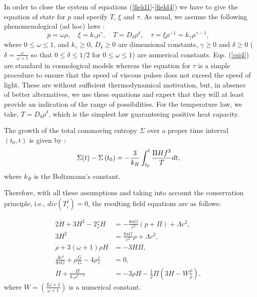 \documentclass{revtex4}
\begin{document}
In order to close the system of equations (\ref{field1}-\ref{field4}) we
have to give the equation of state for $p$ and specify $T$, $\xi $ and $\tau
$. As usual, we assume the following phenomenological (ad hoc) laws \cite
{Ma95}:
\begin{equation}
p=\omega \rho ,\quad \xi =k_{\gamma }\rho ^{\gamma },\quad T=D_{\delta }\rho
^{\delta },\quad \tau =\xi \rho ^{-1}=k_{\gamma }\rho ^{\gamma -1},
\label{csi4}
\end{equation}
where $0\leq \omega \leq 1$, and $k_{\gamma }\geq 0$, $D_{\delta }\geq 0$
are dimensional constants, $\gamma \geq 0$ and $\delta \geq 0$ ($\delta =%
\frac{\omega }{\omega +1}$ so that $0\leq \delta \leq 1/2$ for $0\leq \omega
\leq 1$) are numerical constants. Eqs. (\ref{csi4}) are standard in
cosmological models whereas the equation for $\tau $ is a simple procedure
to ensure that the speed of viscous pulses does not exceed the speed of
light. These are without sufficient thermodynamical motivation, but, in
absence of better alternatives, we use these equations and expect that they
will at least provide an indication of the range of possibilities. For the
temperature law, we take, $T=D_{\delta }\rho ^{\delta }$, which is the
simplest law guaranteeing positive heat capacity.

The growth of the total commoving entropy $\Sigma $ over a proper time
interval $\left( t_{0},t\right) $ is given by \cite{Ma95}:
\begin{equation}
\Sigma (t)-\Sigma \left( t_{0}\right) =-\frac{3}{k_{B}}\int_{t_{0}}^{t}\frac{%
\Pi Hf^{3}}{T}dt,  \label{M entropy}
\end{equation}
where $k_{B}$ is the Boltzmann's constant.

Therefore, with all these assumptions and taking into account the
conservation principle, i.e., $div(T_{i}^{j})=0$, the resulting field
equations are as follows:

\begin{align}
2\dot{H}+3H^{2}-2\frac{\dot{c}}{c}H& =-\frac{8\pi G}{c^{2}}\left( p+\Pi
\right) +\Lambda c^{2},  \label{nfield1} \\
3H^{2}& =\frac{8\pi G}{c^{2}}\rho +\Lambda c^{2},  \label{nfield2} \\
\dot{\rho}+3\left( \omega +1\right) \rho H& =-3H\Pi ,  \label{nfield3} \\
\frac{\dot{\Lambda}c^{4}}{8\pi G}+\rho \frac{\dot{G}}{G}-4\rho \frac{\dot{c}%
}{c}& =0,  \label{nfield4} \\
\dot{\Pi}+\frac{\Pi }{k_{\gamma }\rho ^{\gamma -1}}& =-3\rho H-\frac{1}{2}%
\Pi \left( 3H-W\frac{\dot{\rho}}{\rho }\right) ,  \label{nfield5}
\end{align}
where $W=\left( \frac{2\omega +1}{\omega +1}\right) $ is a numerical
constant.
\end{document}
